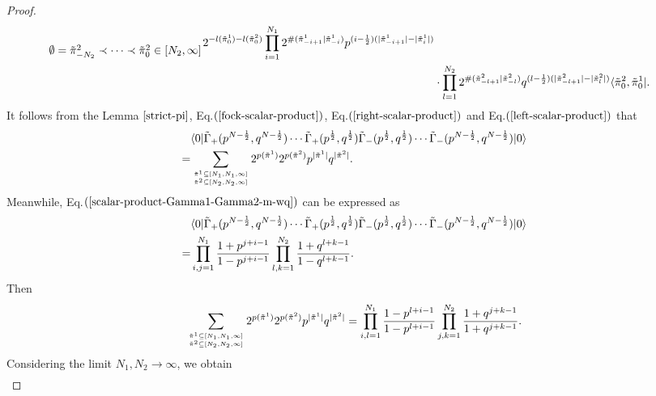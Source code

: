 \documentclass[11pt,reqno]{amsart}
\numberwithin{equation}{section}
\begin{document}
\begin{proof}
\begin{align}
{				\atop{\emptyset=\tilde{\pi}^{2}_{-N_{2}} \prec \cdots \prec \tilde{\pi}^{2}_0  \in [N_{2}, \infty]  }}
			2^{-l(\tilde{\pi}^1_{0})-l(\tilde{\pi}^2_{0})}
			\prod_{i=1}^{N_1}
			2^{\#(\tilde{\pi}^1_{-i+1}|\tilde{\pi}^1_{-i})}
			p^{(i-\frac{1}{2})(|\tilde{\pi}^1_{-i+1}| - |\tilde{\pi}^1_{i}|)}  \notag\\
			&\cdot \prod_{l=1}^{N_2}
			2^{\#(\tilde{\pi}^2_{-l+1}|\tilde{\pi}^2_{-l})}	
			q^{(l-\frac{1}{2})(|\tilde{\pi}^2_{-l+1}| - |\tilde{\pi}^2_{l}|)} \langle\tilde{\pi}^{2}_0, \tilde{\pi}^{1}_0 |.\label{left-scalar-product}
		\end{align}
		It follows from the Lemma $\ref{strict-pi}$, Eq.$(\ref{fock-scalar-product})$, Eq.$(\ref{right-scalar-product})$ and Eq.$(\ref{left-scalar-product})$ that
		\begin{align}
			&\langle 0|
			\tilde{\Gamma}_+(p^{N - \frac{1}{2}},q^{N - \frac{1}{2}})\cdots\tilde{\Gamma}_+(p^{\frac{1}{2}},q^{\frac{1}{2}})
			\tilde{\Gamma}_-(p^{\frac{1}{2}},q^{\frac{1}{2}})\cdots\tilde{\Gamma}_-(p^{N - \frac{1}{2}},q^{N - \frac{1}{2}})
			|0\rangle \notag\\
			=&\sum_{{\tilde{\pi}^{1} \subseteq [N_{1}, N_{1},\infty]}	\atop{\tilde{\pi}^{2} \subseteq [N_{2}, N_{2}, \infty]}}		
			2^{p{(\tilde{\pi}^{1})}}2^{p{(\tilde{\pi}^{2})}}
			p^{|\tilde{\pi}^{1}|}q^{|\tilde{\pi}^{2}|}.
		\end{align}
		Meanwhile, Eq.$(\ref{scalar-product-Gamma1-Gamma2-m-wq})$ can be expressed as
		\begin{align}
			&\langle 0|
			\tilde{\Gamma}_+(p^{N- \frac{1}{2}},q^{N - \frac{1}{2}})\cdots\tilde{\Gamma}_+(p^{\frac{1}{2}},q^{\frac{1}{2}})
			\tilde{\Gamma}_-(p^{\frac{1}{2}},q^{\frac{1}{2}})\cdots\tilde{\Gamma}_-(p^{N - \frac{1}{2}},q^{N - \frac{1}{2}})
			|0\rangle \notag\\
			=&\prod_{i,j=1}^{N_1} \frac{1 + p^{j+i-1}}{1 - p^{j+i-1}}
			\prod_{l,k=1}^{N_2} \frac{1 + q^{l+k-1}}{1 - q^{l+k-1}}.
		\end{align}
		Then
		\begin{align}
			\sum_{{\tilde{\pi}^{1} \subseteq [N_{1}, N_{1},\infty]}	\atop{\tilde{\pi}^{2} \subseteq [N_{2}, N_{2}, \infty]}}	
			2^{p{(\tilde{\pi}^{1})}}2^{p{(\tilde{\pi}^{2})}}	p^{|\tilde{\pi}^{1}|}q^{|\tilde{\pi}^{2}|}	
			=\prod_{i,l=1}^{N_1} \frac{1 - p^{l+i-1}}{1 - p^{l+i-1}} \prod_{j,k=1}^{N_2} \frac{1 + q^{j+k-1}}{1 + q^{j+k-1}}.
		\end{align}
		Considering the limit $N_{1},N_{2} \to \infty$, we obtain
		\begin{align}

\end{align}
\end{proof}
\end{document}
